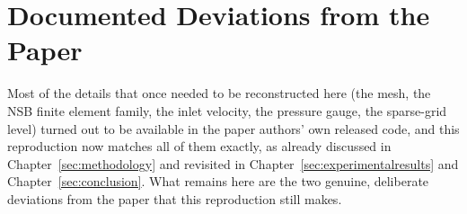 \cleardoubleoddpage%
\chapter{Documented Deviations from the Paper}
\label{app:an-appendix}

Most of the details that once needed to be reconstructed here (the mesh,
the NSB finite element family, the inlet velocity, the pressure gauge, the
sparse-grid level) turned out to be available in the paper authors' own
released code, and this reproduction now matches all of them exactly, as
already discussed in Chapter~\ref{sec:methodology} and revisited in
Chapter~\ref{sec:experimentalresults} and Chapter~\ref{sec:conclusion}.
What remains here are the two genuine, deliberate deviations from the
paper that this reproduction still makes.

